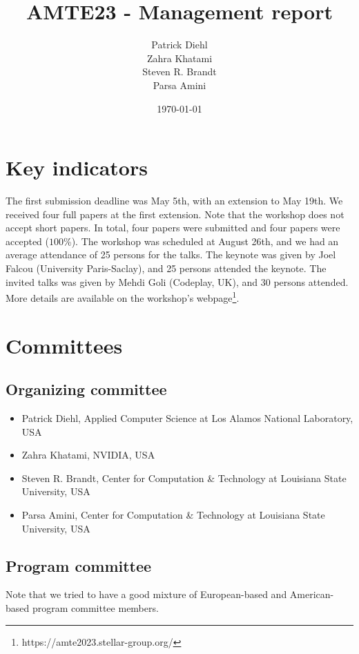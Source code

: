 \documentclass{article}
\title{AMTE23 - Management report}
\author{Patrick Diehl  \\ Zahra Khatami \\ Steven R. Brandt \\ Parsa Amini}
\date{\today}
\begin{document}
\maketitle

\section{Key indicators}
The first submission deadline was May 5th, with an extension to May 19th. We received four full papers at the first extension. Note that the workshop does not accept short papers. In total, four papers were submitted and four papers were accepted ($100$\%). The workshop was scheduled at August 26th, and we had an average attendance of 25 persons for the talks. The keynote was given by Joel Falcou (University Paris-Saclay), and 25 persons attended the keynote. The invited talks was given by Mehdi Goli (Codeplay, UK), and 30 persons attended. More details are available on the workshop's webpage\footnote{https://amte2023.stellar-group.org/}.

\section{Committees}

\subsection{Organizing committee}
\label{sec:committee}

\begin{itemize}
    \item Patrick Diehl, Applied Computer Science at Los Alamos National Laboratory, USA
    \item Zahra Khatami, NVIDIA, USA
    \item Steven R. Brandt, Center for Computation \& Technology at Louisiana State University, USA
    \item Parsa Amini, Center for Computation \& Technology at Louisiana State University, USA
\end{itemize}


\subsection{Program committee}
Note that we tried to have a good mixture of European-based and American-based program committee members.
\end{document}
